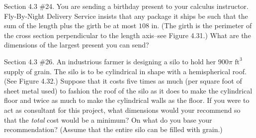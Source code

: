 \documentclass[12pt,letterpaper]{hmcpset}
\begin{document}
\newpage

\begin{problem}
Section 4.3 \#24. You are sending a birthday present to your calculus instructor. Fly-By-Night Delivery Service insists that any package it ships be such that the sum of the length plus the girth be at most $108$ in. (The girth is the perimeter of the cross section perpendicular to the length axis--see Figure 4.31.) What are the dimensions of the largest present you can send?
\end{problem}

\newpage

\begin{problem}
Section 4.3 \#26. An industrious farmer is designing a silo to hold her $900 \pi$ $\text{ft}^3$ supply of grain. The silo is to be cylindrical in shape with a hemispherical roof. (See Figure 4.32.) Suppose that it costs five times as much (per square foot of sheet metal used) to fashion the roof of the silo as it does to make the cylindrical floor and twice as much to make the cylindrical walls as the floor. If you were to act as consultant for this project, what dimensions would your recommend so that the \textit{total} cost would be a minimum? On what do you base your recommendation? (Assume that the entire silo can be filled with grain.)
\end{problem}
\end{document}
